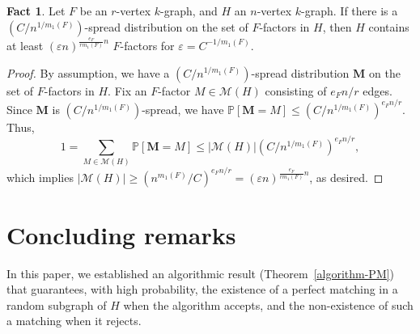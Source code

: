 \documentclass[11pt, letterpaper]{amsart}
\theoremstyle{plain}
\numberwithin{equation}{section}
\theoremstyle{definition}
\newtheorem{fact}[thm]{Fact}
\newcommand\card[1]{\left| #1 \right|}
\begin{document}
    \begin{fact}
        Let \(F\) be an \(r\)-vertex \(k\)-graph, and \(H\) an \(n\)-vertex \(k\)-graph. If there is a \(\left(C/n^{1/m_1(F)}\right)\)-spread distribution on the set of $F$-factors in \(H\), then $H$ contains at least $(\varepsilon n)^{\frac{e_F}{rm_1(F)}n}$ $F$-factors for \(\varepsilon = C^{-1/m_1(F)}\).
    \end{fact}
    \begin{proof}
        By assumption, we have a \(\left(C/n^{1/m_1(F)}\right)\)-spread distribution \(\textbf{M}\) on the set of \(F\)-factors in \(H\). 
        Fix an \(F\)-factor \(M\in \mathcal{M}(H)\) consisting of  \(e_Fn/r\) edges. Since \(\textbf{M}\) is \(\left(C/n^{1/m_1(F)}\right)\)-spread, we have \(\mathbb{P}[\textbf{M}=M]\le (C/n^{1/m_1(F)})^{e_Fn/r}\). 
        Thus, \[1=\sum_{M\in \mathcal{M}(H)}\mathbb{P}[\textbf{M}=M]\le \card{\mathcal{M}(H)}(C/n^{1/m_1(F)})^{e_Fn/r},\]
        which implies \(\card{\mathcal{M}(H)}\ge (n^{m_1(F)}/C)^{e_Fn/r}= (\varepsilon n)^{\frac{e_F}{rm_1(F)}n}\), as desired. 
    \end{proof}
    
    \section{Concluding remarks}\label{remark}
    
    In this paper, we established an algorithmic result (Theorem~\ref{algorithm-PM}) that guarantees, with high probability, the existence of a perfect matching in a random subgraph of \(H\) when the algorithm accepts, and the non-existence of such a matching when it rejects. 
    
\end{document}
